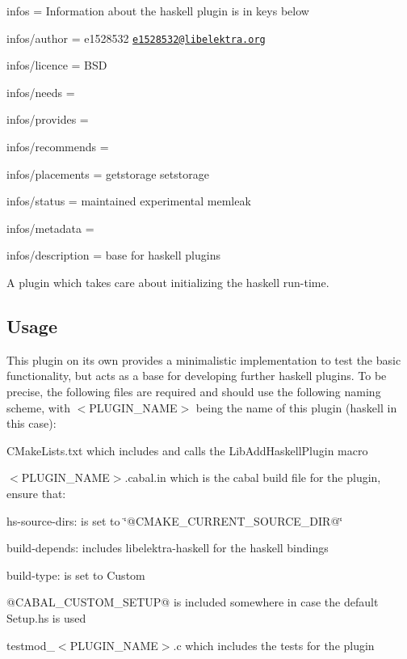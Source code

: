 
\begin{DoxyItemize}
\item infos = Information about the haskell plugin is in keys below
\item infos/author = e1528532 \href{mailto:e1528532@libelektra.org}{\tt e1528532@libelektra.\+org}
\item infos/licence = B\+SD
\item infos/needs =
\item infos/provides =
\item infos/recommends =
\item infos/placements = getstorage setstorage
\item infos/status = maintained experimental memleak
\item infos/metadata =
\item infos/description = base for haskell plugins
\end{DoxyItemize}

A plugin which takes care about initializing the haskell run-\/time.

\subsection*{Usage}

This plugin on its own provides a minimalistic implementation to test the basic functionality, but acts as a base for developing further haskell plugins. To be precise, the following files are required and should use the following naming scheme, with {\ttfamily $<$P\+L\+U\+G\+I\+N\+\_\+\+N\+A\+ME$>$} being the name of this plugin ({\ttfamily haskell} in this case)\+:


\begin{DoxyItemize}
\item C\+Make\+Lists.\+txt which includes and calls the Lib\+Add\+Haskell\+Plugin macro
\item {\ttfamily $<$P\+L\+U\+G\+I\+N\+\_\+\+N\+A\+ME$>$.cabal.\+in} which is the cabal build file for the plugin, ensure that\+:
\begin{DoxyItemize}
\item {\ttfamily hs-\/source-\/dirs\+:} is set to {\ttfamily \char`\"{}@\+C\+M\+A\+K\+E\+\_\+\+C\+U\+R\+R\+E\+N\+T\+\_\+\+S\+O\+U\+R\+C\+E\+\_\+\+D\+I\+R@\char`\"{}}
\item {\ttfamily build-\/depends\+:} includes {\ttfamily libelektra-\/haskell} for the haskell bindings
\item {\ttfamily build-\/type\+:} is set to {\ttfamily Custom}
\item {\ttfamily @C\+A\+B\+A\+L\+\_\+\+C\+U\+S\+T\+O\+M\+\_\+\+S\+E\+T\+UP@} is included somewhere in case the default Setup.\+hs is used
\end{DoxyItemize}
\item {\ttfamily testmod\+\_\+$<$P\+L\+U\+G\+I\+N\+\_\+\+N\+A\+ME$>$.c} which includes the tests for the plugin
\end{DoxyItemize}

